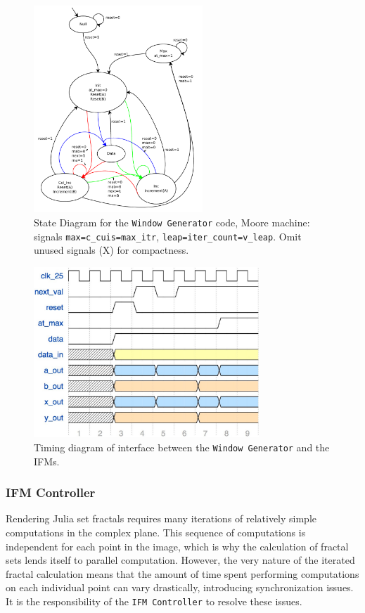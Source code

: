 \documentclass{article}
\begin{document}
\begin{figure}
  \centering
    \includegraphics[width=180pt]{state_diagrams/diff_window_gen.pdf}
  \caption{State Diagram for the \texttt{Window Generator} code, Moore machine:
    signals \texttt{max=c\_cuis=max\_itr},
    \texttt{leap=iter\_count=v\_leap}. Omit unused signals (X) for
    compactness.}
\end{figure}


\begin{figure}
  \centering
    \includegraphics[width=240pt]{timing_diagrams/gen_ifm.pdf}
  \caption{Timing diagram of interface between the \texttt{Window Generator}
    and the IFMs.}
\end{figure}

\subsubsection{IFM Controller}

Rendering Julia set fractals requires many iterations of relatively
simple computations in the complex plane. This sequence of
computations is independent for each point in the image, which is why
the calculation of fractal sets lends itself to parallel
computation. However, the very nature of the iterated fractal
calculation means that the amount of time spent performing computations on each individual point
can vary drastically, introducing synchronization issues. It is the responsibility of the
\texttt{IFM Controller} to resolve these issues.
\end{document}
